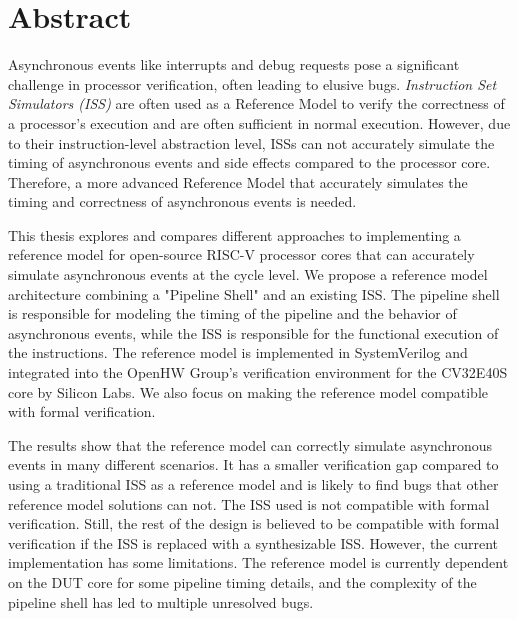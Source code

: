 \chapter*{Abstract}

Asynchronous events like interrupts and debug requests pose a significant challenge in processor verification, often leading to elusive bugs. 
\textit{Instruction Set Simulators (ISS)} are often used as a Reference Model to verify the correctness of a processor's execution and are often sufficient in normal execution. 
However, due to their instruction-level abstraction level, ISSs can not accurately simulate the timing of asynchronous events and side effects compared to the processor core. Therefore, a more advanced Reference Model that accurately simulates the timing and correctness of asynchronous events is needed.


This thesis explores and compares different approaches to implementing a reference model for open-source RISC-V processor cores that can accurately simulate asynchronous events at the cycle level. We propose a reference model architecture combining a "Pipeline Shell" and an existing ISS. The pipeline shell is responsible for modeling the timing of the pipeline and the behavior of asynchronous events, while the ISS is responsible for the functional execution of the instructions. The reference model is implemented in SystemVerilog and integrated into the OpenHW Group's verification environment for the CV32E40S core by Silicon Labs. We also focus on making the reference model compatible with formal verification.

The results show that the reference model can correctly simulate asynchronous events in many different scenarios. It has a smaller verification gap compared to using a traditional ISS as a reference model and is likely to find bugs that other reference model solutions can not. The ISS used is not compatible with formal verification. Still, the rest of the design is believed to be compatible with formal verification if the ISS is replaced with a synthesizable ISS. However, the current implementation has some limitations. The reference model is currently dependent on the DUT core for some pipeline timing details, and the complexity of the pipeline shell has led to multiple unresolved bugs.







